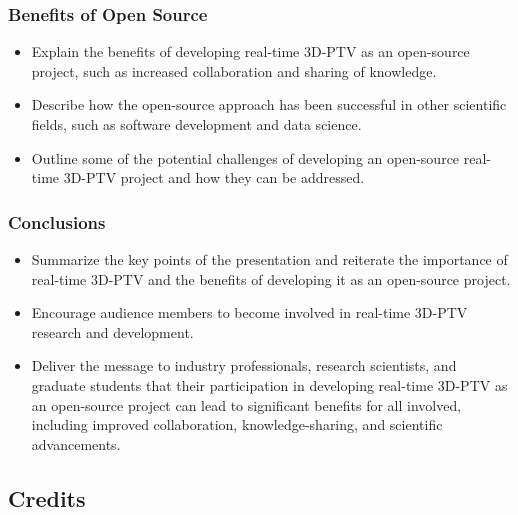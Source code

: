\documentclass[aspectratio=43]{beamer}
\begin{document}
\begin{frame}
\frametitle{Benefits of Open Source}
\begin{itemize}
\item Explain the benefits of developing real-time 3D-PTV as an open-source project, such as increased collaboration and sharing of knowledge.
\item Describe how the open-source approach has been successful in other scientific fields, such as software development and data science.
\item Outline some of the potential challenges of developing an open-source real-time 3D-PTV project and how they can be addressed.
\end{itemize}
\end{frame}

\begin{frame}
\frametitle{Conclusions}
\begin{itemize}
\item Summarize the key points of the presentation and reiterate the importance of real-time 3D-PTV and the benefits of developing it as an open-source project.
\item Encourage audience members to become involved in real-time 3D-PTV research and development.
\item Deliver the message to industry professionals, research scientists, and graduate students that their participation in developing real-time 3D-PTV as an open-source project can lead to significant benefits for all involved, including improved collaboration, knowledge-sharing, and scientific advancements.
\end{itemize}
\end{frame}










\subsection{Credits}
\end{document}
